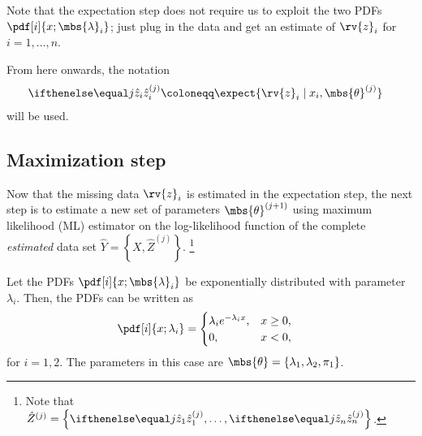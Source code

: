 Note that the expectation step does not require us to exploit the two PDFs $\pdf[i]{x; \mbs{\lambda}_{i}}$; just plug in the data and get an estimate of $\rv{z}_{i}$ for $i=1,\ldots, n$.


\begin{blueBox}
    From here onwards, the notation 
    \begin{align}
        \label{eq:xhat notation def}
        \zhat[j]{i} &\coloneqq  
        \expect{\rv{z}_{i} \mid x_{i}, \mbs{\theta}^{(j)}}
    \end{align}
    will be used.
\end{blueBox}
\subsection{Maximization step}
Now that the missing data $\rv{z}_{i}$ is estimated in the expectation step, the next step is to estimate a new set of parameters $\mbs{\theta}^{(j+1)}$ using maximum likelihood (ML) estimator on the log-likelihood function of the complete \emph{estimated} data set $\hat{Y} = \left\{ X, \hat{Z}^{(j)} \right\}$. \footnote{Note that $\hat{Z}^{(j)} = \left\{ \zhat[j]{1},\ldots, \zhat[j]{n} \right\}$.}

Let the PDFs $\pdf[i]{x; \mbs{\lambda}_{i}}$ be exponentially distributed with parameter $\lambda_{i}$. Then, the PDFs can be written as
\begin{align}
    \pdf[i]{x; \lambda_{i}} &= 
    \begin{cases}
        \lambda_{i}e^{-\lambda_{i} x}, & x\geq 0,\\
        0, &x<0,
    \end{cases}
\end{align}
for $i=1,2$. The parameters in this case are $\mbs{\theta} = \left\{ \lambda_{1}, \lambda_{2}, \pi_{1} \right\}$.

